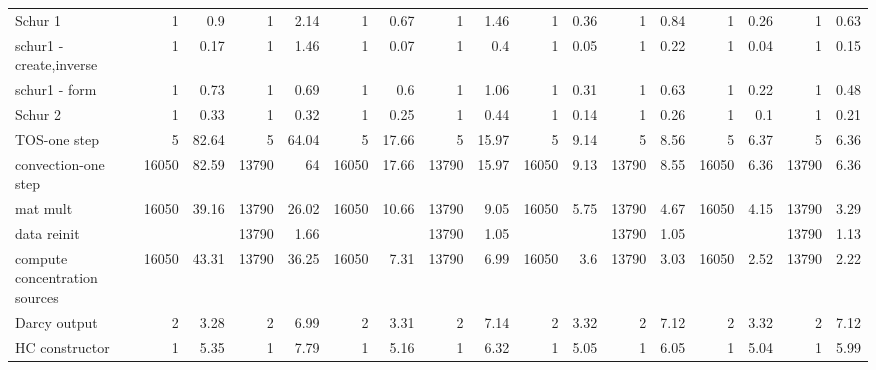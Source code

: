 \begin{sidewaystable}[!htbp]
\begin{tabular}{|l|r|r|r|r|r|r|r|r|r|r|r|r|r|r|r|r|}
   Schur 1                           &   1   &   0.9 &   1   &   2.14    &   1   &   0.67    &   1   &   1.46    &   1   &   0.36    &   1   &   0.84    &   1   &   0.26    &   1   &   0.63    \\
    schur1 - create,inverse         &   1   &   0.17    &   1   &   1.46    &   1   &   0.07    &   1   &   0.4 &   1   &   0.05    &   1   &   0.22    &   1   &   0.04    &   1   &   0.15    \\
    schur1 - form                   &   1   &   0.73    &   1   &   0.69    &   1   &   0.6 &   1   &   1.06    &   1   &   0.31    &   1   &   0.63    &   1   &   0.22    &   1   &   0.48    \\
   Schur 2                            &   1   &   0.33    &   1   &   0.32    &   1   &   0.25    &   1   &   0.44    &   1   &   0.14    &   1   &   0.26    &   1   &   0.1 &   1   &   0.21    \\
  TOS-one step                        &   5   &   82.64   &   5   &   64.04   &   5   &   17.66   &   5   &   15.97   &   5   &   9.14    &   5   &   8.56    &   5   &   6.37    &   5   &   6.36    \\
\rowcolor{GreenYellow} 
   convection-one step               &   16050   &   82.59   &   13790   &   64  &   16050   &   17.66   &   13790   &   15.97   &   16050   &   9.13    &   13790   &   8.55    &   16050   &   6.36    &   13790   &   6.36    \\ 
    mat mult                        &   16050   &   39.16   &   13790   &   26.02   &   16050   &   10.66   &   13790   &   9.05    &   16050   &   5.75    &   13790   &   4.67    &   16050   &   4.15    &   13790   &   3.29    \\
    data reinit                     &           &           &   13790   &   1.66    &           &           &   13790   &   1.05    &           &           &   13790   &   1.05    &           &           &   13790   &   1.13    \\
    compute concentration sources   &   16050   &   43.31   &   13790   &   36.25   &   16050   &   7.31    &   13790   &   6.99    &   16050   &   3.6 &   13790   &   3.03    &   16050   &   2.52    &   13790   &   2.22    \\
\rowcolor{GreenYellow}
  Darcy output                         &   2   &   3.28    &   2   &   6.99    &   2   &   3.31    &   2   &   7.14    &   2   &   3.32    &   2   &   7.12    &   2   &   3.32    &   2   &   7.12    \\
 HC constructor                         &   1   &   5.35    &   1   &   7.79    &   1   &   5.16    &   1   &   6.32    &   1   &   5.05    &   1   &   6.05    &   1   &   5.04    &   1   &   5.99    \\

\end{tabular}
\end{sidewaystable}
